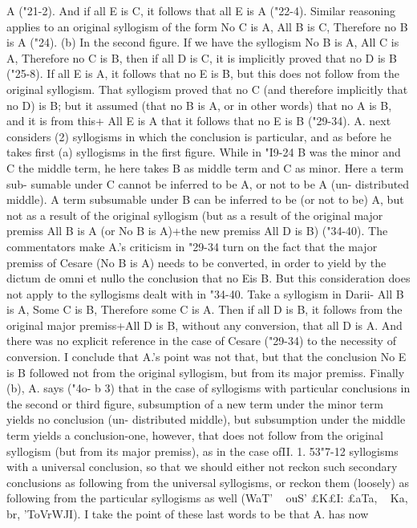 A ("21-2). And if all E is C, it follows that all E is A ("22-4).
Similar reasoning applies to an original syllogism of the form
No C is A, All B is C, Therefore no B is A ("24). (b) In the second
figure. If we have the syllogism No B is A, All C is A, Therefore
no C is B, then if all D is C, it is implicitly proved that no D is
B ("25-8). If all E is A, it follows that no E is B, but this does not
follow from the original syllogism. That syllogism proved that no
C (and therefore implicitly that no D) is B; but it assumed (that
no B is A, or in other words) that no A is B, and it is from this+
All E is A that it follows that no E is B ("29-34).
A. next considers (2) syllogisms in which the conclusion is
particular, and as before he takes first (a) syllogisms in the first
figure. While in "I9-24 B was the minor and C the middle term,
he here takes B as middle term and C as minor. Here a term sub-
sumable under C cannot be inferred to be A, or not to be A (un-
distributed middle). A term subsumable under B can be inferred
to be (or not to be) A, but not as a result of the original syllogism
(but as a result of the original major premiss All B is A (or No B
is A)+the new premiss All D is B) ("34-40).
The commentators make A.'s criticism in "29-34 turn on the
fact that the major premiss of Cesare (No B is A) needs to be
converted, in order to yield by the dictum de omni et nullo the
conclusion that no Eis B. But this consideration does not apply
to the syllogisms dealt with in "34-40. Take a syllogism in Darii-
All B is A, Some C is B, Therefore some C is A. Then if all D is
B, it follows from the original major premiss+All D is B,
without any conversion, that all D is A. And there was no
explicit reference in the case of Cesare ("29-34) to the necessity of
conversion. I conclude that A.'s point was not that, but that the
conclusion No E is B followed not from the original syllogism, but
from its major premiss.
Finally (b), A. says ("4o- b 3) that in the case of syllogisms with
particular conclusions in the second or third figure, subsumption
of a new term under the minor term yields no conclusion (un-
distributed middle), but subsumption under the middle term
yields a conclusion-one, however, that does not follow from the
original syllogism (but from its major premiss), as in the case ofII. 1. 53"7-12
syllogisms with a universal conclusion, so that we should either
not reckon such secondary conclusions as following from the
universal syllogisms, or reckon them (loosely) as following from
the particular syllogisms as well (WaT' ~ ouS' £K£I: £aTa, ~ Ka, br,
'ToVrWJI). I take the point of these last words to be that A. has now
